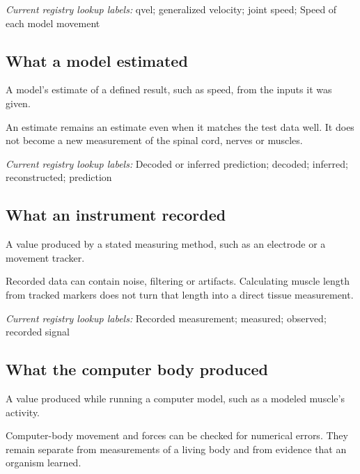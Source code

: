 \noindent\textit{Current registry lookup labels:} qvel; generalized velocity; joint speed; Speed of each model movement\par

\begin{samepage}
\subsection*{What a model estimated}
\noindent A model’s estimate of a defined result, such as speed, from the inputs it was given.\par
\end{samepage}
\begin{samepage}
\noindent An estimate remains an estimate even when it matches the test data well. It does not become a new measurement of the spinal cord, nerves or muscles.\par\nopagebreak[4]

\end{samepage}


\noindent\textit{Current registry lookup labels:} Decoded or inferred prediction; decoded; inferred; reconstructed; prediction\par

\begin{samepage}
\subsection*{What an instrument recorded}
\noindent A value produced by a stated measuring method, such as an electrode or a movement tracker.\par
\end{samepage}
\begin{samepage}
\noindent Recorded data can contain noise, filtering or artifacts. Calculating muscle length from tracked markers does not turn that length into a direct tissue measurement.\par\nopagebreak[4]

\end{samepage}


\noindent\textit{Current registry lookup labels:} Recorded measurement; measured; observed; recorded signal\par

\begin{samepage}
\subsection*{What the computer body produced}
\noindent A value produced while running a computer model, such as a modeled muscle’s activity.\par
\end{samepage}
\begin{samepage}
\noindent Computer-body movement and forces can be checked for numerical errors. They remain separate from measurements of a living body and from evidence that an organism learned.\par\nopagebreak[4]

\end{samepage}



